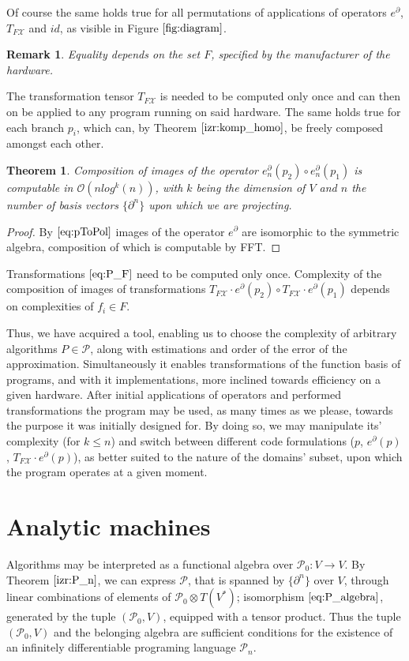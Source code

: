 \documentclass{article}
\newcommand{\X}{\mathcal{X}}
\newcommand{\dP}{\mathcal{P}}
\newcommand{\D}{\partial}
\newtheorem{izrek}{Theorem}[section]
\newtheorem{opomba}{Remark}[section]
\begin{document}
Of course the same holds true for all permutations of applications of operators $e^\D$, $T_{F\X}$ and $id$, as visible in Figure $\ref{fig:diagram}$.

\begin{opomba}
Equality depends on the set $F$, specified by the manufacturer of the hardware.
\end{opomba}

The transformation tensor $T_{F\X}$ is needed to be computed only once and can then on be applied to any program running on said hardware. The same holds true for each branch $p_i$, which can, by Theorem $\ref{izr:komp_homo}$, be freely composed amongst each other.

\begin{izrek}
Composition of images of the operator $e_n^\D(p_2)\circ e_n^\D(p_1)$ is computable in $\mathcal{O}(nlog^k(n))$, with $k$ being the dimension of $V$ and $n$ the number of basis vectors $\{\D^n\}$ upon which we are projecting.
\end{izrek}

\begin{proof}
	By $\eqref{eq:pToPol}$ images of the operator $e^\D$ are isomorphic to the symmetric algebra, composition of which is computable by FFT.
\end{proof}

Transformations $\eqref{eq:P_F}$ need to be computed only once. Complexity of the composition of images of transformations $T_{F\X}\cdot e^\D(p_2)\circ T_{F\X}\cdot e^\D(p_1)$ depends on complexities of $f_i\in F$.

Thus, we have acquired a tool, enabling us to choose the complexity of arbitrary algorithms $P\in\dP$, along with estimations and order of the error of the approximation. Simultaneously it enables transformations of the function basis of programs, and with it implementations, more inclined towards efficiency on a given hardware. After initial applications of operators and performed transformations the program may be used, as many times as we please, towards the purpose it was initially designed for. By doing so, we may manipulate its' complexity (for $k\le n$) and switch between different code formulations ($p$, $e^\D(p)$, $T_{F\X}\cdot e^\D(p)$), as better suited to the nature of the domains' subset, upon which the program operates at a given moment.

\section{Analytic machines}
Algorithms may be interpreted as a functional algebra over $\dP_0:V\to V$.
By Theorem $\ref{izr:P_n}$, we can express $\dP$, that is spanned by $\{\D^n\}$ over $V$, through linear combinations of elements of $\dP_0\otimes T(V^*)$; isomorphism $\eqref{eq:P_algebra}$, generated by the tuple $(\dP_0,V)$, equipped with a tensor product. Thus the tuple  $(\dP_0,V)$ and the belonging algebra are sufficient conditions for the existence of an infinitely differentiable programing language $\dP_n$.
\end{document}
